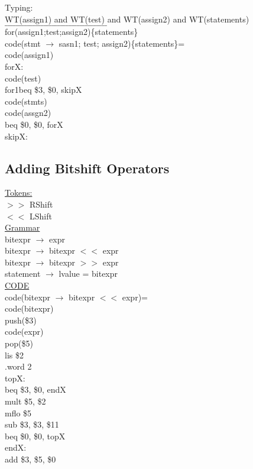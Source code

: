 \documentclass[12pt]{article}
\begin{document}
	Typing:\\
	WT(assign1) and WT(test) and WT(assign2) and WT(statements)\\
	$\_\_\_\_\_\_\_\_\_\_\_\_\_\_\_\_\_\_\_\_\_\_\_\_\_\_\_\_\_\_\_\_\_\_\_\_\_$\\
	for(assign1;test;assign2)\{statements\}\\
	
	code(stmt $\rightarrow$ sasn1; test; assign2)\{statements\}=\\
	code(assign1)\\
	forX:\\
	code(test)\\
	for1beq \$3, \$0, skipX\\
	code(stmts)\\
	code(assgn2)\\
	beq \$0, \$0, forX\\
	skipX:\\
	
	\subsection*{Adding Bitshift Operators}
	\underline{Tokens:}\\
	$>>$ RShift\\
	$<<$ LShift\\
	
	\underline{Grammar}\\
	bitexpr $\rightarrow$ expr\\
	bitexpr $\rightarrow$ bitexpr $<<$ expr\\
	bitexpr $\rightarrow$ bitexpr $>>$ expr\\
	statement $\rightarrow$ lvalue = bitexpr\\
	
	\underline{CODE}\\
	code(bitexpr $\rightarrow$ bitexpr $<<$ expr)=\\
	code(bitexpr)\\
	push(\$3)\\
	code(expr)\\
	pop(\$5)\\
	lis \$2\\
	.word 2\\
	topX:\\
	beq \$3, \$0, endX\\
	mult \$5, \$2\\
	mflo \$5\\
	sub \$3, \$3, \$11\\
	beq \$0, \$0, topX\\
	endX:\\
	add \$3, \$5, \$0\\
	
\end{document}
